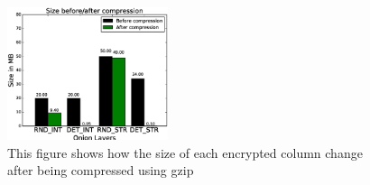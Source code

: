 \begin{figure}   
  \begin{minipage}[t]{0.5\linewidth}  
    \centering   
    \includegraphics[width=4.7cm]{images/aftercompression.eps}   
    \caption{\small{This figure shows how the size of each encrypted column change after being compressed using gzip}} 
    \label{fig:stack12}   
  \end{minipage}%
\end{figure}




